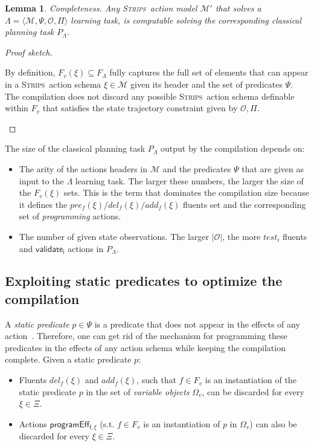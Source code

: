 \documentclass[3p,times]{elsarticle}
\newtheorem{mylemma}[mytheorem]{Lemma}
\newcommand{\strips}{\textsc{Strips}}     %
\newcommand{\tup}[1]{{\langle #1 \rangle}}
\begin{document}
\begin{mylemma}
Completeness. Any \strips\ action model $\mathcal{M}'$ that solves a $\Lambda=\tup{\mathcal{M},\Psi,\mathcal{O},\Pi}$ learning task, is computable solving the corresponding classical planning task $P_{\Lambda}$.
\end{mylemma}

\begin{proof}[Proof sketch]
\begin{small}
By definition, $F_v(\xi)\subseteq F_\Lambda$ fully captures the full set of elements that can appear in a \strips\ action schema $\xi\in\mathcal{M}$ given its header and the set of predicates $\Psi$. The compilation does not discard any possible \strips\ action schema definable within $F_v$ that satisfies the state trajectory constraint given by $\mathcal{O},\Pi$.
\end{small}
\end{proof}

The size of the classical planning task $P_{\Lambda}$ output by the compilation depends on:
\begin{itemize}
\item The arity of the actions headers in $\mathcal{M}$ and the predicates $\Psi$ that are given as input to the $\Lambda$ learning task. The larger these numbers, the larger the size of the $F_v(\xi)$ sets. This is the term that dominates the compilation size because it defines the $pre_f(\xi)/del_f(\xi)/add_f(\xi)$ fluents set and the corresponding set of {\em programming} actions. 
\item The number of given state observations. The larger $|\mathcal{O}|$, the more $test_i$ fluents and $\mathsf{validate_{i}}$ actions in $P_{\Lambda}$.
\end{itemize}



\subsection{Exploiting static predicates to optimize the compilation}
A {\em static predicate} $p \in \Psi$ is a predicate that does not appear in the effects of any action~\cite{fox:TIM:JAIR1998}. Therefore, one can get rid of the mechanism for programming these predicates in the effects of any action schema while keeping the compilation complete. Given a static predicate $p$:
\begin{itemize}
\item Fluents $del_f(\xi)$ and $add_f(\xi)$, such that $f\in F_v$ is an instantiation of the static predicate $p$ in the set of {\em variable objects} $\Omega_v$, can be discarded for every $\xi\in\Xi$.
\item Actions $\mathsf{programEff_{f,\xi}}$ (s.t. $f\in F_v$ is an instantiation of $p$ in $\Omega_v$) can also be discarded for every $\xi\in\Xi$.
\end{itemize}
\end{document}

